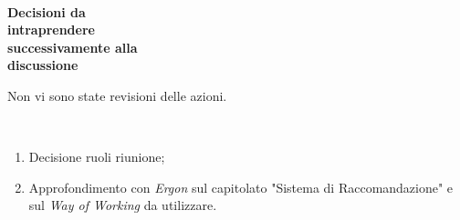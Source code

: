\documentclass{article}
\begin{document}
\begin{paracol}{2}
\\
\textbf{Decisioni da\\intraprendere\\successivamente alla\\discussione}
\switchcolumn


\begin{enumerate}
Non vi sono state revisioni delle azioni.
\end{enumerate}
\vspace{19.8em}

\\
\begin{enumerate}
    \item Decisione ruoli riunione; 
    \item Approfondimento con \textit{Ergon} sul capitolato "Sistema di Raccomandazione" e sul \textit{Way of Working} da utilizzare.
\end{enumerate}
\newpage
\begin{enumerate}[i.]


\end{enumerate}
\end{paracol}
\end{document}

